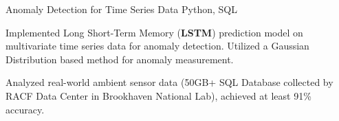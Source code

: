 \begin{cventries}
\projentry
{Anomaly Detection for Time Series Data}
{Python, SQL} %
{ %
\begin{cvitems}
\item{Implemented Long Short-Term Memory (\textbf{LSTM}) prediction model on multivariate time series data for anomaly detection. Utilized a Gaussian Distribution based method for anomaly measurement.}
\item{Analyzed real-world ambient sensor data (50GB+ SQL Database collected by RACF Data Center in Brookhaven National Lab), achieved at least 91\% accuracy.}
\end{cvitems}
}







\end{cventries}
